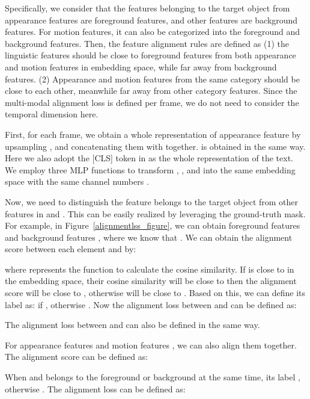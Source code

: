 \documentclass[10pt,twocolumn,letterpaper]{article}
\begin{document}
Specifically, we consider that the features belonging to the target object from appearance features are foreground features, and other features are background features. For motion features, it can also be categorized into the foreground and background features. Then, the feature alignment rules are defined as (1) the linguistic features should be close to foreground features from both appearance and motion features in embedding space, while far away from background features. (2) Appearance and motion features from the same category should be close to each other, meanwhile far away from other category features. Since the multi-modal alignment loss is defined per frame, we do not need to consider the temporal dimension here.  




First, for each frame, we obtain a whole representation of appearance feature  by upsampling ,  and concatenating them with  together.  is obtained in the same way. Here we also adopt the [CLS] token  in  as the whole representation of the text. We employ three MLP functions to transform ,  , and  into the same embedding space with the same channel numbers .  

Now, we need to distinguish the feature belongs to the target object from other features in  and . This can be easily realized by leveraging the ground-truth mask. For example, in Figure~\ref{alignmentlss_figure}, we can obtain foreground features  and background features , where we know that . We can obtain the alignment score  between each element  and  by:
\vspace{-2mm}


where  represents the function to calculate the cosine similarity. If  is close to  in the embedding space, their cosine similarity will be close to  then the alignment score  will be close to , otherwise  will be close to . Based on this, we can define its label  as: if ,  otherwise . Now the alignment loss  between  and  can be defined as:
\vspace{-1mm}

The alignment loss  between  and  can also be defined in the same way.



For appearance features  and motion features , we can also align them together. The alignment score can be defined as:
\vspace{-2mm}


When  and  belongs to the foreground or background at the same time, its label , otherwise  . The alignment loss  can be defined as:
\end{document}
